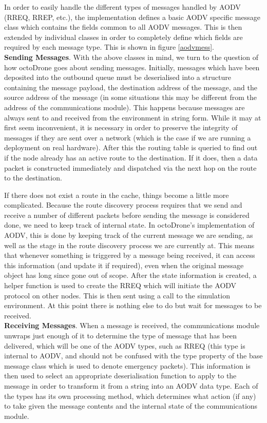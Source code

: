 In order to easily handle the different types of messages handled by AODV (RREQ, RREP, etc.), the implementation defines a basic AODV specific message class which contains the fields common to all AODV messages. This is then extended by individual classes in order to completely define which fields are required by each message type. This is shown in figure \ref{aodvmess}.\\

\noindent\textbf{Sending Messages}. 
With the above classes in mind, we turn to the question of how octoDrone goes about sending messages. Initially, messages which have been deposited into the outbound queue must be deserialised into a structure containing the message payload, the destination address of the message, and the source address of the message (in some situations this may be different from the address of the communications module). This happens because messages are always sent to and received from the environment in string form. While it may at first seem inconvenient, it is necessary in order to preserve the integrity of messages if they are sent over a network (which is the case if we are running a deployment on real hardware). After this the routing table is queried to find out if the node already has an active route to the destination. If it does, then a data packet is constructed immediately and dispatched via the next hop on the route to the destination.

If there does not exist a route in the cache, things become a little more complicated. Because the route discovery process requires that we send and receive a number of different packets before sending the message is considered done, we need to keep track of internal state. In octoDrone's implementation of AODV, this is done by keeping track of the current message we are sending, as well as the stage in the route discovery process we are currently at. This means that whenever something is triggered by a message being received, it can access this information (and update it if required), even when the original message object has long since gone out of scope. After the state information is created, a helper function is used to create the RREQ which will initiate the AODV protocol on other nodes. This is then sent using a call to the simulation environment. At this point there is nothing else to do but wait for messages to be received.\\

\noindent\textbf{Receiving Messages}. 
When a message is received, the communications module unwraps just enough of it to determine the type of message that has been delivered, which will be one of the AODV types, such as RREQ (this type is internal to AODV, and should not be confused with the type property of the base message class which is used to denote emergency packets). This information is then used to select an appropriate deserialisation function to apply to the message in order to transform it from a string into an AODV data type. Each of the types has its own processing method, which determines what action (if any) to take given the message contents and the internal state of the communications module.

